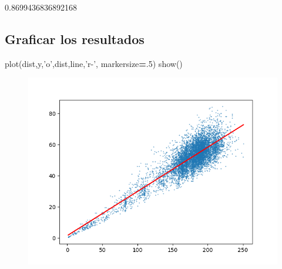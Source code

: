 \documentclass[]{article}
\newenvironment{Shaded}{\begin{snugshade}}{\end{snugshade}}
\newcommand{\DecValTok}[1]{\textcolor[rgb]{0.00,0.00,0.81}{#1}}
\newcommand{\StringTok}[1]{\textcolor[rgb]{0.31,0.60,0.02}{#1}}
\newcommand{\OperatorTok}[1]{\textcolor[rgb]{0.81,0.36,0.00}{\textbf{#1}}}
\newcommand{\NormalTok}[1]{#1}
\begin{document}
0.8699436836892168

\subsection{Graficar los resultados}\label{graficar-los-resultados}

\begin{Shaded}
\begin{Highlighting}[]
\NormalTok{plot(dist,y,}\StringTok{'o'}\NormalTok{,dist,line,}\StringTok{'r-'}\NormalTok{, markersize}\OperatorTok{=}\NormalTok{.}\DecValTok{5}\NormalTok{)}
\NormalTok{show()}
\end{Highlighting}
\end{Shaded}

\begin{figure}[htbp]
\centering
\includegraphics{Figure_1.png}
\end{figure}
\end{document}
